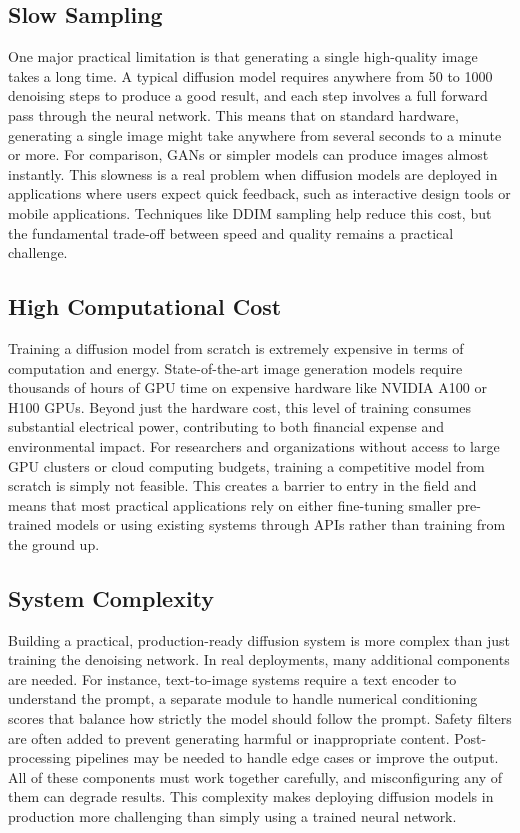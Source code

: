 \documentclass[a4paper,12pt]{article}
\begin{document}
\subsection{Slow Sampling}
One major practical limitation is that generating a single high-quality image takes a long time. A typical diffusion model requires anywhere from 50 to 1000 denoising steps to produce a good result, and each step involves a full forward pass through the neural network. This means that on standard hardware, generating a single image might take anywhere from several seconds to a minute or more. For comparison, GANs or simpler models can produce images almost instantly. This slowness is a real problem when diffusion models are deployed in applications where users expect quick feedback, such as interactive design tools or mobile applications. Techniques like DDIM sampling help reduce this cost, but the fundamental trade-off between speed and quality remains a practical challenge.

\subsection{High Computational Cost}
Training a diffusion model from scratch is extremely expensive in terms of computation and energy. State-of-the-art image generation models require thousands of hours of GPU time on expensive hardware like NVIDIA A100 or H100 GPUs. Beyond just the hardware cost, this level of training consumes substantial electrical power, contributing to both financial expense and environmental impact. For researchers and organizations without access to large GPU clusters or cloud computing budgets, training a competitive model from scratch is simply not feasible. This creates a barrier to entry in the field and means that most practical applications rely on either fine-tuning smaller pre-trained models or using existing systems through APIs rather than training from the ground up.

\subsection{System Complexity}
Building a practical, production-ready diffusion system is more complex than just training the denoising network. In real deployments, many additional components are needed. For instance, text-to-image systems require a text encoder to understand the prompt, a separate module to handle numerical conditioning scores that balance how strictly the model should follow the prompt. Safety filters are often added to prevent generating harmful or inappropriate content. Post-processing pipelines may be needed to handle edge cases or improve the output. All of these components must work together carefully, and misconfiguring any of them can degrade results. This complexity makes deploying diffusion models in production more challenging than simply using a trained neural network.
\end{document}
